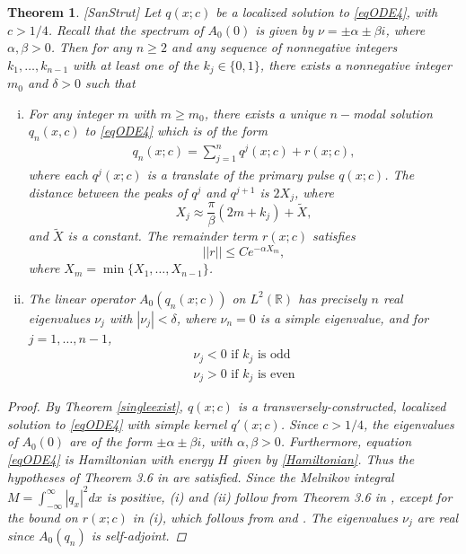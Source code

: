 \documentclass[12pt]{article}
\def\R{{\mathbb R}}
\newtheorem{theorem}{Theorem}
\begin{document}
\begin{theorem}\label{multiexist}[SanStrut]
Let $q(x; c)$ be a localized solution to \eqref{eqODE4}, with $c > 1/4$. Recall that the spectrum of $A_0(0)$ is given by $\nu = \pm \alpha \pm \beta i$, where $\alpha, \beta > 0$. Then for any $n \geq 2$ and any sequence of nonnegative integers $k_1, \dots, k_{n-1}$ with at least one of the $k_j \in \{0, 1 \}$, there exists a nonnegative integer $m_0$ and $\delta > 0$ such that
\begin{enumerate}[(i)]
	\item For any integer $m$ with $m \geq m_0$, there exists a unique $n-$modal solution $q_n(x, c)$ to \eqref{eqODE4} which is of the form
	\begin{align}\label{qn}
	q_n(x; c) = \sum_{j = 1}^{n} q^j(x; c) + r(x; c),
	\end{align}
	where each $q^j(x; c)$ is a translate of the primary pulse $q(x; c)$. The distance between the peaks of $q^j$ and $q^{j+1}$ is $2 X_j$, where
	\begin{equation*}
	X_j \approx \frac{\pi}{\beta}(2 m + k_j) + \tilde{X},
	\end{equation*}
	and $\tilde{X}$ is a constant. The remainder term $r(x; c)$ satisfies
	\begin{equation}\label{rbound}
	||r|| \leq C e^{-\alpha X_m},
	\end{equation}
	where $X_m = \min\{X_1, \dots, X_{n-1}\}$.

	\item The linear operator $A_0(q_n(x; c))$ on $L^2(\R)$ has precisely $n$ real eigenvalues $\nu_j$ with $|\nu_j| < \delta$, where $\nu_n = 0$ is a simple eigenvalue, and for $j = 1, \dots, n-1$,
	\begin{align*}
	\nu_j < 0 \text{ if } k_j \text{ is odd} \\
	\nu_j > 0 \text{ if } k_j \text{ is even} 
	\end{align*}

\end{enumerate}

\begin{proof}
By Theorem \ref{singleexist}, $q(x; c)$ is a transversely-constructed, localized solution to \eqref{eqODE4} with simple kernel $q'(x; c)$. Since $c > 1/4$, the eigenvalues of $A_0(0)$ are of the form $\pm \alpha \pm \beta i$, with $\alpha, \beta > 0$. Furthermore, equation \eqref{eqODE4} is Hamiltonian with energy $H$ given by \eqref{Hamiltonian}. Thus the hypotheses of Theorem 3.6 in \cite{Sandstede1997} are satisfied. Since the Melnikov integral $M = \int_{-\infty}^\infty |q_x|^2 dx$ is positive, (i) and (ii) follow from Theorem 3.6 in \cite{Sandstede1997}, except for the bound on $r(x; c)$ in (i), which follows from \cite{Sanstede1993} and \cite{Sandstede1998}. The eigenvalues $\nu_j$ are real since $A_0(q_n)$ is self-adjoint.
\end{proof}
\end{theorem}
\end{document}
